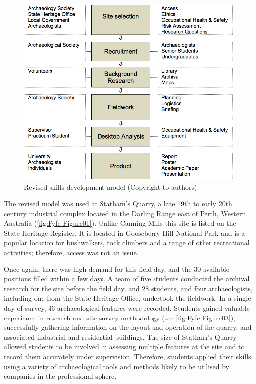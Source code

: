 \documentclass[%
]{ijsra}
\begin{document}
	\begin{figure} %
		\includegraphics[width=\linewidth]{figures/Fyfe-Figure02}
		\caption{Revised skills development model (Copyright to authors).}
		\centering
		\label{fig:Fyfe-Figure02}
	\end{figure}
	
	
	The revised model was used at Statham’s Quarry, a late 19th to early 20th century industrial complex located in the Darling Range east of Perth, Western Australia (\cref{fig:Fyfe-Figure01}). Unlike Canning Mills this site is listed on the State Heritage Register. It is located in Gooseberry Hill National Park and is a popular location for bushwalkers, rock climbers and a range of other recreational activities; therefore, access was not an issue.
	
	Once again, there was high demand for this field day, and the 30 available positions filled within a few days. A team of five students conducted the archival research for the site before the field day, and 28 students, and four archaeologists, including one from the State Heritage Office, undertook the fieldwork. 
	In a single day of survey, 46 archaeological features were recorded. 
	Students gained valuable experience in research and site survey methodology (see \cref{fig:Fyfe-Figure03}), successfully gathering information on the layout and operation of the quarry, and associated industrial and residential buildings. 
	The size of Statham’s Quarry allowed students to be involved in assessing multiple features at the site and to record them accurately under supervision. Therefore, students applied their skills using a variety of archaeological tools and methods likely to be utilised by companies in the professional sphere.
	
\end{document}
